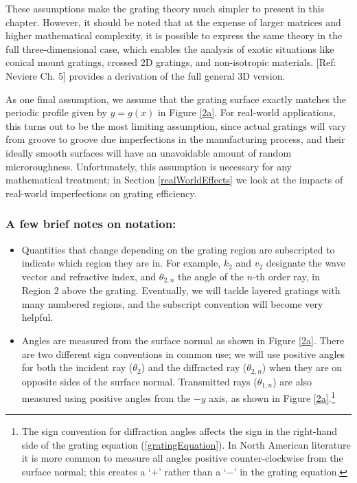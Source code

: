 These assumptions make the grating theory much simpler to present in this chapter. However, it should be noted that at the expense of larger matrices and higher mathematical complexity, it is possible to express the same theory in the full three-dimensional case, which enables the analysis of exotic situations like conical mount gratings, crossed 2D gratings, and non-isotropic materials.  [Ref: Neviere Ch. 5] provides a derivation of the full general 3D version.

As one final assumption, we assume that the grating surface exactly matches the periodic profile given by $y=g(x)$ in Figure \ref{2a}.  For real-world applications, this turns out to be the most limiting assumption, since actual gratings will vary from groove to groove due imperfections in the manufacturing process, and their ideally smooth surfaces will have an unavoidable amount of random microroughness.  Unfortunately, this assumption is necessary for any mathematical treatment; in Section \ref{realWorldEffects} we look at the impacts of real-world  imperfections on grating efficiency.

\subsubsection{A few brief notes on notation:}
\begin{itemize}
\item Quantities that change depending on the grating region are subscripted to indicate which region they are in.  For example, $k_2$ and $v_2$ designate the wave vector and refractive index, and $\theta_{2,n}$ the angle of the $n$-th order ray, in Region 2 above the grating.  Eventually, we will tackle layered gratings with many numbered regions, and the subscript convention will become very helpful.
\item Angles are measured from the surface normal as shown in Figure \ref{2a}.  There are two different sign conventions in common use; we will use positive angles for both the incident ray ($\theta_2$) and the diffracted ray ($\theta_{2,n}$) when they are on opposite sides of the surface normal.  Transmitted rays ($\theta_{1,n}$) are also measured using positive angles from the $-y$ axis, as shown in Figure \ref{2a}.\footnote{The sign convention for diffraction angles affects the sign in the right-hand side of the grating equation (\ref{gratingEquation}).  In North American literature it is more common to measure all angles positive counter-clockwise from the surface normal; this creates a `$+$' rather than a `$-$' in the grating equation.}
\end{itemize}

